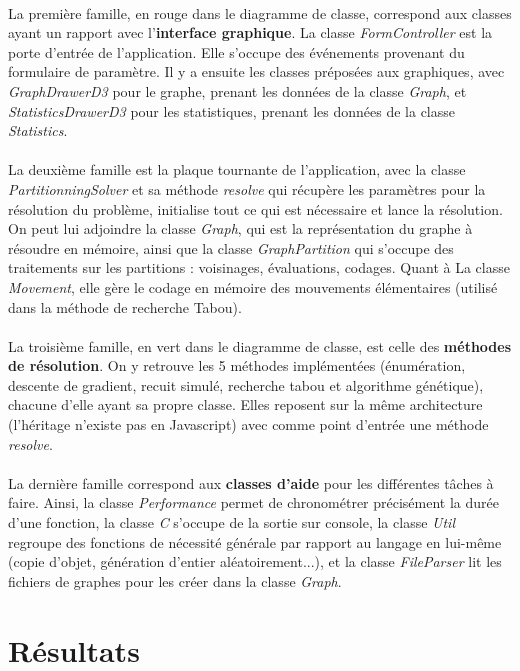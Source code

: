 \documentclass[12pt]{article}
\begin{document}
\paragraph{}La première famille, en rouge dans le diagramme de classe, correspond aux classes ayant un rapport avec l'\textbf{interface graphique}. La classe \textit{FormController} est la porte d'entrée de l'application. Elle s'occupe des événements provenant du formulaire de paramètre. Il y a ensuite les classes préposées aux graphiques, avec \textit{GraphDrawerD3} pour le graphe, prenant les données de la classe \textit{Graph}, et \textit{StatisticsDrawerD3} pour les statistiques, prenant les données de la classe \textit{Statistics}.

\paragraph{}La deuxième famille est la plaque tournante de l'application, avec la classe \textit{PartitionningSolver} et sa méthode \textit{resolve} qui récupère les paramètres pour la résolution du problème, initialise tout ce qui est nécessaire et lance la résolution. On peut lui adjoindre la classe \textit{Graph}, qui est la représentation du graphe à résoudre en mémoire, ainsi que la classe \textit{GraphPartition} qui s'occupe des traitements sur les partitions : voisinages, évaluations, codages. Quant à La classe \textit{Movement}, elle gère le codage en mémoire des mouvements élémentaires (utilisé dans la méthode de recherche Tabou).

\paragraph{}La troisième famille, en vert dans le diagramme de classe, est celle des \textbf{méthodes de résolution}. On y retrouve les 5 méthodes implémentées (énumération, descente de gradient, recuit simulé, recherche tabou et algorithme génétique), chacune d'elle ayant sa propre classe. Elles reposent sur la même architecture (l'héritage n'existe pas en Javascript) avec comme point d'entrée une méthode \textit{resolve}.

\paragraph{}La dernière famille correspond aux \textbf{classes d'aide} pour les différentes tâches à faire. Ainsi, la classe \textit{Performance} permet de chronométrer précisément la durée d'une fonction, la classe \textit{C} s'occupe de la sortie sur console, la classe \textit{Util} regroupe des fonctions de nécessité générale par rapport au langage en lui-même (copie d'objet, génération d'entier aléatoirement...), et la classe \textit{FileParser} lit les fichiers de graphes pour les créer dans la classe \textit{Graph}.

\section{Résultats}
\end{document}
